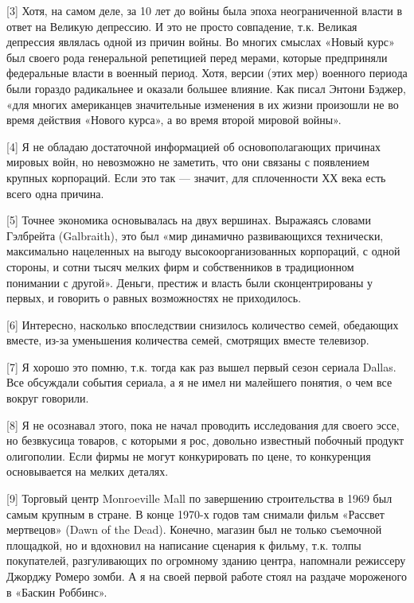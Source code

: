 \documentclass[ebook,12pt,oneside,openany]{memoir}
\begin{document}
[3] Хотя, на самом деле, за 10 лет до войны была эпоха неограниченной
власти в ответ на Великую депрессию. И это не просто совпадение, т.к.
Великая депрессия являлась одной из причин войны. Во многих смыслах
«Новый курс» был своего рода генеральной репетицией перед мерами,
которые предприняли федеральные власти в военный период. Хотя, версии
(этих мер) военного периода были гораздо радикальнее и оказали большее
влияние. Как писал Энтони Бэджер, «для многих американцев значительные
изменения в их жизни произошли не во время действия «Нового курса», а
во время второй мировой войны». \newline

[4] Я не обладаю достаточной информацией об основополагающих причинах
мировых войн, но невозможно не заметить, что они связаны с появлением
крупных корпораций. Если это так — значит, для сплоченности ХХ века
есть всего одна причина. \newline

[5] Точнее экономика основывалась на двух вершинах. Выражаясь словами
Гэлбрейта (Galbraith), это был «мир динамично развивающихся
технически, максимально нацеленных на выгоду высокоорганизованных
корпораций, с одной стороны, и сотни тысяч мелких фирм и собственников
в традиционном понимании с другой». Деньги, престиж и власть были
сконцентрированы у первых, и говорить о равных возможностях не
приходилось. \newline

[6] Интересно, насколько впоследствии снизилось количество семей,
обедающих вместе, из-за уменьшения количества семей, смотрящих вместе
телевизор. \newline

[7] Я хорошо это помню, т.к. тогда как раз вышел первый сезон сериала
Dallas. Все обсуждали события сериала, а я не имел ни малейшего
понятия, о чем все вокруг говорили. \newline

[8] Я не осознавал этого, пока не начал проводить исследования для
своего эссе, но безвкусица товаров, с которыми я рос, довольно
известный побочный продукт олигополии. Если фирмы не могут
конкурировать по цене, то конкуренция основывается на мелких деталях. \newline

[9] Торговый центр Monroeville Mall по завершению строительства в 1969
был самым крупным в стране. В конце 1970-х годов там снимали фильм
«Рассвет мертвецов» (Dawn of the Dead). Конечно, магазин был не только
съемочной площадкой, но и вдохновил на написание сценария к фильму,
т.к. толпы покупателей, разгуливающих по огромному зданию центра,
напомнали режиссеру Джорджу Ромеро зомби. А я на своей первой работе
стоял на раздаче мороженого в «Баскин Роббинс». \newline
\end{document}
